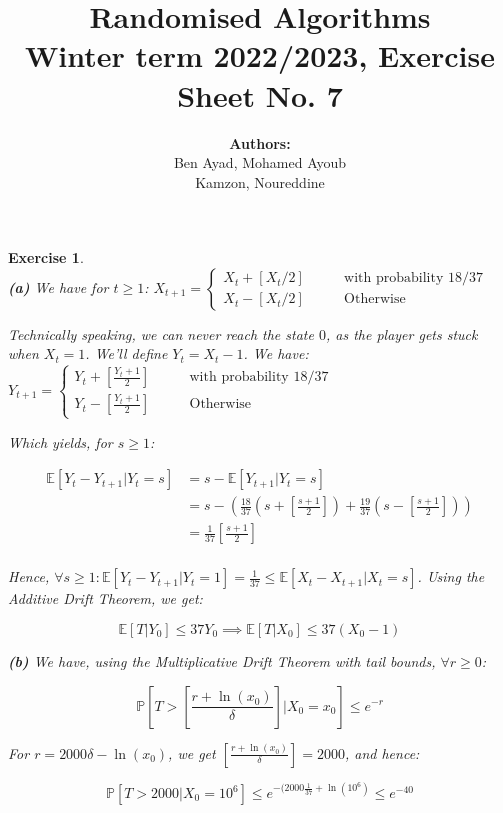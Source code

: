\documentclass{article}
\title{Randomised Algorithms \\
Winter term 2022/2023, Exercise Sheet No. 7}
\author{
    \textbf{Authors:} \\
    Ben Ayad, Mohamed Ayoub \\
    Kamzon, Noureddine
}
\newtheorem{exo}{Exercise}
\def\P{\mathbb{P}}
\def\E{\mathbb{E}}
\begin{document}
\maketitle

\begin{exo}{\ \\}
\noindent
\textbf{(a)} We have for $t \geq 1$:  \quad \quad  $
X_{t+1}  = 
\begin{cases}
    X_t + [X_t/2]  \quad \quad &\text{with probability 18/37} \\
    X_t - [X_t/2]  &\text{Otherwise}
\end{cases}
$

Technically speaking, we can never reach the state $0$, as the player gets stuck when $X_t = 1$. We'll define $Y_t = X_t - 1$. We have: $
Y_{t+1}  = 
\begin{cases}
    Y_t + [\frac{Y_t+1}{2}]  \quad \quad &\text{with probability 18/37} \\
    Y_t - [\frac{Y_t+1}{2}]  &\text{Otherwise}
\end{cases}
$

Which yields, for $s \geq 1$:

\begin{align*}
    \E[Y_t-Y_{t+1}| Y_t = s] 
    &= s - \E[Y_{t+1}|Y_t = s] \\
    &= s - (\frac{18}{37}(s+[\frac{s+1}{2}])  
    + \frac{19}{37}(s-[\frac{s+1}{2}])) \\
    &= \frac{1}{37} [\frac{s+1}{2}] \\
\end{align*}

Hence, $\forall s \geq 1: \E[Y_t - Y_{t+1}| Y_t = 1] = \frac{1}{37} \leq \E[X_t - X_{t+1}| X_t = s]$. Using the Additive Drift Theorem, we get:


\[ \E[T | Y_0] \leq 37 Y_0 \implies \E[T | X_0] \leq 37(X_0 -1)\]

\noindent
\textbf{(b)} We have, using the Multiplicative Drift Theorem with tail bounds, $\forall r \geq 0$:

\[
\P[T > [\frac{r+\ln(x_0)}{\delta}]| X_0 = x_0] \leq e^{-r}
\]

For $r = 2000\delta - \ln(x_0)$, we get $[\frac{r+\ln(x_0)}{\delta}] = 2000$, and hence:

\[
\P[T > 2000 | X_0 = 10^6] 
\leq e^{-(2000 \frac{1}{37} + \ln(10^6)} 
\leq e^{-40}
\]


\end{exo}
\end{document}

